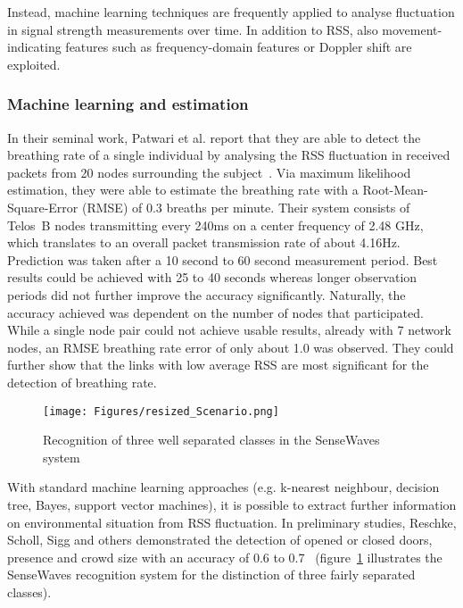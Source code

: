\documentclass[journal]{IEEEtran}
\begin{document}
\begin{figure*}
  Instead, machine learning techniques are frequently applied to analyse fluctuation in signal strength  measurements over time.
  In addition to RSS, also movement-indicating features such as frequency-domain features or Doppler shift are exploited. 

\subsubsection{Machine learning and estimation}
In their seminal work, Patwari et al. report that they are able to detect the breathing rate of a single individual by analysing the RSS fluctuation in received packets from 20 nodes surrounding the subject~\cite{RFSensing_Patwari_2011b}.
Via maximum likelihood estimation, they were able to estimate the breathing rate with a Root-Mean-Square-Error (RMSE) of 0.3 breaths per minute.
Their system consists of Telos~B nodes transmitting every 240ms on a center frequency of 2.48 GHz, which translates to an overall packet transmission rate of about 4.16Hz.
Prediction was taken after a 10 second to 60 second measurement period. 
Best results could be achieved with 25 to 40 seconds whereas longer observation periods did not further improve the accuracy significantly.
Naturally, the accuracy achieved was dependent on the number of nodes that participated. 
While a single node pair could not achieve usable results, already with 7 network nodes, an RMSE breathing rate error of only about 1.0 was observed.
They could further show that the links with low average RSS are most significant for the detection of breathing rate.

\begin{figure}
\centering
  \texttt{[image: Figures/resized\_Scenario.png]}
  \caption{Recognition of three well separated classes in the SenseWaves system~\cite{Pervasive_Scholz_2011}}
\label{figureSystem}
\end{figure}
With standard machine learning approaches (e.g. k-nearest neighbour, decision tree, Bayes, support vector machines), it is possible to extract further information on environmental situation from RSS fluctuation.
In preliminary studies, Reschke, Scholl, Sigg and others demonstrated the detection of opened or closed doors, presence and crowd size with an accuracy of 0.6 to 0.7~\cite{4036,ContextAwareness_Sigg_2011,Pervasive_Scholz_2011,OrganicComputing_Sigg_2011} (figure~\ref{figureSystem} illustrates the SenseWaves recognition system for the distinction of three fairly separated classes).


\end{figure*}
\end{document}
